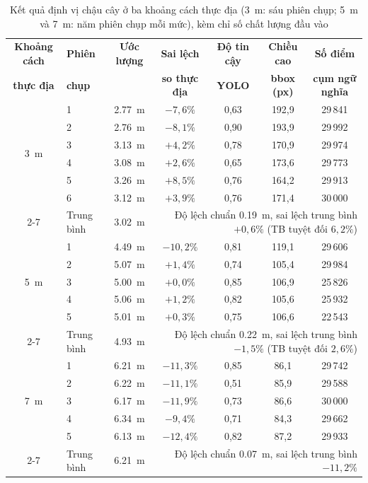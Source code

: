 \documentclass[10pt,a4paper,twocolumn]{article}
\begin{document}
\begin{table}[t]
\centering
\small
\caption{Kết quả định vị chậu cây ở ba khoảng cách thực địa (\SI{3}{\meter}: sáu phiên chụp; \SI{5}{\meter} và \SI{7}{\meter}: năm phiên chụp mỗi mức), kèm chỉ số chất lượng đầu vào}
\label{tab:semantic-bearing-results}
\begin{tabular}{@{}clccccc@{}}
\toprule
\textbf{Khoảng cách} & \textbf{Phiên} & \textbf{Ước lượng} & \textbf{Sai lệch} & \textbf{Độ tin cậy} & \textbf{Chiều cao} & \textbf{Số điểm} \\
\textbf{thực địa} & \textbf{chụp} & & \textbf{so thực địa} & \textbf{YOLO} & \textbf{bbox (px)} & \textbf{cụm ngữ nghĩa} \\
\midrule
\multirow{6}{*}{\SI{3}{\meter}}
 & 1 & \SI{2.77}{\meter} & $-7{,}6\%$ & 0,63 & 192,9 & 29\,841 \\
 & 2 & \SI{2.76}{\meter} & $-8{,}1\%$ & 0,90 & 193,9 & 29\,992 \\
 & 3 & \SI{3.13}{\meter} & $+4{,}2\%$ & 0,78 & 170,9 & 29\,974 \\
 & 4 & \SI{3.08}{\meter} & $+2{,}6\%$ & 0,65 & 173,6 & 29\,773 \\
 & 5 & \SI{3.26}{\meter} & $+8{,}5\%$ & 0,76 & 164,2 & 29\,913 \\
 & 6 & \SI{3.12}{\meter} & $+3{,}9\%$ & 0,76 & 171,4 & 30\,000 \\
\cmidrule(l){2-7}
 & \multicolumn{1}{l}{Trung bình} & \SI{3.02}{\meter} & \multicolumn{4}{r}{Độ lệch chuẩn \SI{0.19}{\meter}, sai lệch trung bình $+0{,}6\%$ (TB tuyệt đối $6{,}2\%$)} \\
\midrule
\multirow{5}{*}{\SI{5}{\meter}}
 & 1 & \SI{4.49}{\meter} & $-10{,}2\%$ & 0,81 & 119,1 & 29\,606 \\
 & 2 & \SI{5.07}{\meter} & $+1{,}4\%$  & 0,74 & 105,4 & 29\,984 \\
 & 3 & \SI{5.00}{\meter} & $+0{,}0\%$  & 0,85 & 106,9 & 25\,826 \\
 & 4 & \SI{5.06}{\meter} & $+1{,}2\%$  & 0,82 & 105,6 & 25\,932 \\
 & 5 & \SI{5.01}{\meter} & $+0{,}3\%$  & 0,75 & 106,6 & 22\,543 \\
\cmidrule(l){2-7}
 & \multicolumn{1}{l}{Trung bình} & \SI{4.93}{\meter} & \multicolumn{4}{r}{Độ lệch chuẩn \SI{0.22}{\meter}, sai lệch trung bình $-1{,}5\%$ (TB tuyệt đối $2{,}6\%$)} \\
\midrule
\multirow{5}{*}{\SI{7}{\meter}}
 & 1 & \SI{6.21}{\meter} & $-11{,}3\%$ & 0,85 & 86,1 & 29\,742 \\
 & 2 & \SI{6.22}{\meter} & $-11{,}1\%$ & 0,51 & 85,9 & 29\,588 \\
 & 3 & \SI{6.17}{\meter} & $-11{,}9\%$ & 0,73 & 86,6 & 30\,000 \\
 & 4 & \SI{6.34}{\meter} & $-9{,}4\%$  & 0,71 & 84,3 & 29\,662 \\
 & 5 & \SI{6.13}{\meter} & $-12{,}4\%$ & 0,82 & 87,2 & 29\,933 \\
\cmidrule(l){2-7}
 & \multicolumn{1}{l}{Trung bình} & \SI{6.21}{\meter} & \multicolumn{4}{r}{Độ lệch chuẩn \SI{0.07}{\meter}, sai lệch trung bình $-11{,}2\%$} \\
\bottomrule
\end{tabular}
\end{table}
\FloatBarrier
\end{document}
